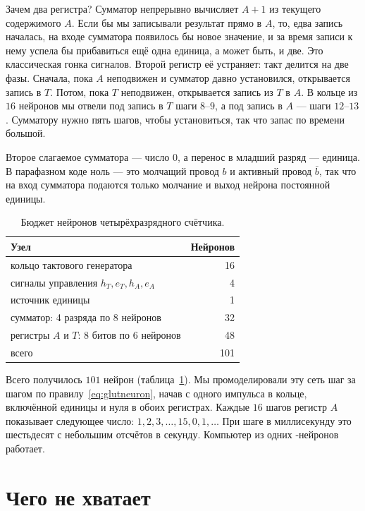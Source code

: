 Зачем два регистра? Сумматор непрерывно вычисляет $A+1$ из текущего содержимого $A$. Если бы мы записывали результат прямо в $A$, то, едва запись началась, на входе сумматора появилось бы новое значение, и за время записи к нему успела бы прибавиться ещё одна единица, а может быть, и две. Это классическая гонка сигналов. Второй регистр её устраняет: такт делится на две фазы. Сначала, пока $A$ неподвижен и сумматор давно установился, открывается запись в $T$. Потом, пока $T$ неподвижен, открывается запись из $T$ в $A$. В кольце из $16$ нейронов мы отвели под запись в $T$ шаги $8$--$9$, а под запись в $A$ --- шаги $12$--$13$. Сумматору нужно пять шагов, чтобы установиться, так что запас по времени большой.

Второе слагаемое сумматора --- число $0$, а перенос в младший разряд --- единица. В парафазном коде ноль --- это молчащий провод $b$ и активный провод $\bar b$, так что на вход сумматора подаются только молчание и выход нейрона постоянной единицы.

\begin{table}[t]
\centering
\small
\begin{tabular}{lr}
\toprule
Узел & Нейронов \\
\midrule
кольцо тактового генератора & 16 \\
сигналы управления $h_T,e_T,h_A,e_A$ & 4 \\
источник единицы & 1 \\
сумматор: 4 разряда по 8 нейронов & 32 \\
регистры $A$ и $T$: 8 битов по 6 нейронов & 48 \\
\midrule
всего & 101 \\
\bottomrule
\end{tabular}
\caption{Бюджет нейронов четырёхразрядного счётчика.}
\label{tab:counter}
\end{table}

Всего получилось $101$ нейрон (таблица~\ref{tab:counter}). Мы промоделировали эту сеть шаг за шагом по правилу~\eqref{eq:glutneuron}, начав с одного импульса в кольце, включённой единицы и нуля в обоих регистрах. Каждые $16$ шагов регистр $A$ показывает следующее число: $1,2,3,\dots,15,0,1,\dots$ При шаге в миллисекунду это шестьдесят с небольшим отсчётов в секунду. Компьютер из одних -нейронов работает.

\section{Чего не хватает}

